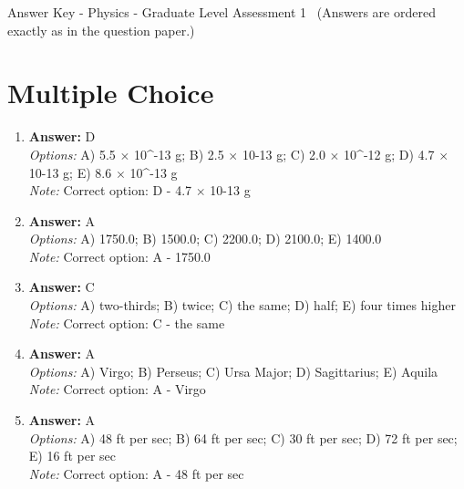\documentclass[12pt]{article}
\begin{document}
\begin{center}
Answer Key - Physics - Graduate Level Assessment 1 \
\small (Answers are ordered exactly as in the question paper.)
\end{center}

\section*{Multiple Choice}
\begin{enumerate}[label=\arabic*.]
\item \textbf{Answer:} D
\\ \textit{Options:} A) 5.5 \ensuremath{\times} 10^-13 g; B) 2.5 \ensuremath{\times} 10-13 g; C) 2.0 \ensuremath{\times} 10^-12 g; D) 4.7 \ensuremath{\times} 10-13 g; E) 8.6 \ensuremath{\times} 10^-13 g
\\ \textit{Note:} Correct option: D - 4.7 \ensuremath{\times} 10-13 g
\item \textbf{Answer:} A
\\ \textit{Options:} A) 1750.0; B) 1500.0; C) 2200.0; D) 2100.0; E) 1400.0
\\ \textit{Note:} Correct option: A - 1750.0
\item \textbf{Answer:} C
\\ \textit{Options:} A) two-thirds; B) twice; C) the same; D) half; E) four times higher
\\ \textit{Note:} Correct option: C - the same
\item \textbf{Answer:} A
\\ \textit{Options:} A) Virgo; B) Perseus; C) Ursa Major; D) Sagittarius; E) Aquila
\\ \textit{Note:} Correct option: A - Virgo
\item \textbf{Answer:} A
\\ \textit{Options:} A) 48 ft per sec; B) 64 ft per sec; C) 30 ft per sec; D) 72 ft per sec; E) 16 ft per sec
\\ \textit{Note:} Correct option: A - 48 ft per sec
\end{enumerate}
\end{document}
